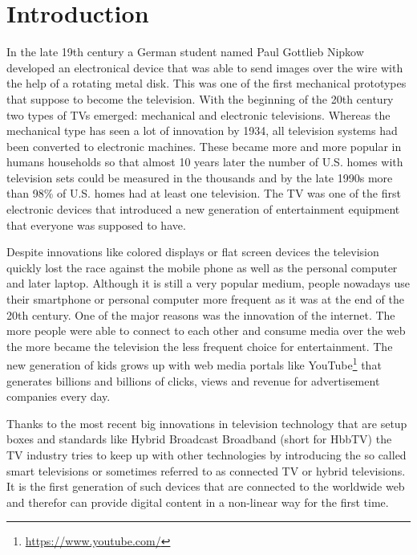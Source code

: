 %

\chapter{Introduction\label{cha:introduction}}

In the late 19th century a German student named Paul Gottlieb Nipkow developed an electronical device that was able to send images over the wire with the help of a rotating metal disk. This was one of the first mechanical prototypes that suppose to become the television. With the beginning of the 20th century two types of TVs emerged: mechanical and electronic televisions. Whereas the mechanical type has seen a lot of innovation by 1934, all television systems had been converted to electronic machines. These became more and more popular in humans households so that almost 10 years later the number of U.S. homes with television sets could be measured in the thousands and by the late 1990s more than 98\% of U.S. homes had at least one television. The TV was one of the first electronic devices that introduced a new generation of entertainment equipment that everyone was supposed to have.

Despite innovations like colored displays or flat screen devices the television quickly lost the race against the mobile phone as well as the personal computer and later laptop. Although it is still a very popular medium, people nowadays use their smartphone or personal computer more frequent as it was at the end of the 20th century. One of the major reasons was the innovation of the internet. The more people were able to connect to each other and consume media over the web the more became the television the less frequent choice for entertainment. The new generation of kids grows up with web media portals like YouTube\footnote{\url{https://www.youtube.com/}} that generates billions and billions of clicks, views and revenue for advertisement companies every day.

Thanks to the most recent big innovations in television technology that are setup boxes and standards like Hybrid Broadcast Broadband (short for HbbTV) the TV industry tries to keep up with other technologies by introducing the so called smart televisions or sometimes referred to as connected TV or hybrid televisions. It is the first generation of such devices that are connected to the worldwide web and therefor can provide digital content in a non-linear way for the first time.

